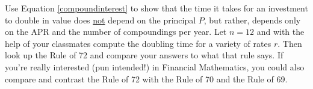 {Use Equation \ref{compoundinterest} to show that the time it takes for an investment to double in value does \underline{not} depend on the principal $P$, but rather, depends only on the APR and the number of compoundings per year.  Let $n = 12$ and with the help of your classmates compute the doubling time for a variety of rates $r$.  Then look up the Rule of 72 and compare your answers to what that rule says.  If you're really interested (pun intended!) in Financial Mathematics, you could also compare and contrast the Rule of 72 with the Rule of 70 and the Rule of 69.}
{}